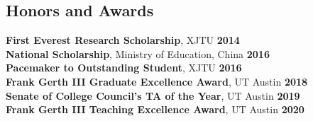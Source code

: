 \documentclass[margin,line]{res}
\newenvironment{list1}{
  \begin{list}{\ding{113}}{%
      \setlength{\itemsep}{0in}
      \setlength{\parsep}{0in} \setlength{\parskip}{0in}
      \setlength{\topsep}{0in} \setlength{\partopsep}{0in} 
      \setlength{\leftmargin}{0.17in}}}{\end{list}}
\begin{document}
\begin{resume}




\section{\sc Honors and Awards} 
{\bf First Everest Research Scholarship}, %
XJTU \hfill {\bf 2014}\\
{\bf National Scholarship}, 
Ministry of Education, China \hfill {\bf 2016}\\
{\bf Pacemaker to Outstanding Student}, %
XJTU \hfill {\bf 2016}\\
{\bf Frank Gerth III Graduate Excellence Award}, UT Austin \hfill {\bf 2018}\\
{\bf Senate of College Council's TA of the Year}, UT Austin \hfill {\bf 2019}\\
{\bf Frank Gerth III Teaching Excellence Award}, UT Austin \hfill {\bf 2020}


\end{resume}
\end{document}

